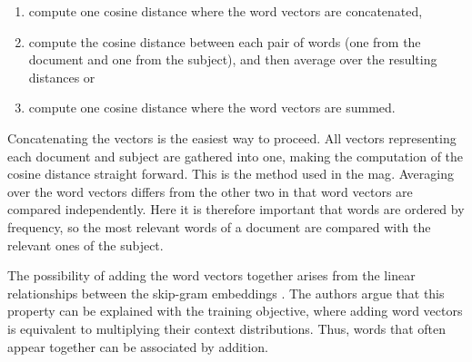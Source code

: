 \begin{enumerate}
    \item compute one cosine distance where the word vectors are concatenated,
    \item compute the cosine distance between each pair of words (one from the document and one from the subject), and then average over the resulting distances or
    \item compute one cosine distance where the word vectors are summed.
\end{enumerate}

Concatenating the vectors is the easiest way to proceed. All vectors representing each document and subject are gathered into one, making the computation of the cosine distance straight forward. This is the method used in the \acrshort{mag}. Averaging over the word vectors differs from the other two in that word vectors are compared independently. Here it is therefore important that words are ordered by frequency, so the most relevant words of a document are compared with the relevant ones of the subject.

The possibility of adding the word vectors together arises from the linear relationships between the skip-gram embeddings \cite{mikolov2013distributed}. The authors argue that this property can be explained with the training objective, where adding word vectors is equivalent to multiplying their context distributions. Thus, words that often appear together can be associated by addition.
